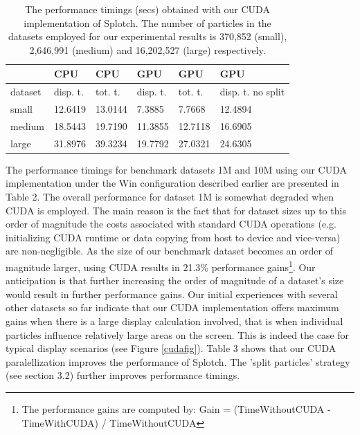 \begin{table}
\caption{The performance timings (secs) obtained with our CUDA implementation of Splotch. 
The number of particles in the datasets employed for our experimental results is 
370,852 (small), 2,646,991 (medium) and 16,202,527 (large) respectively.}

\begin{center}
\begin{tabular}{ | l || l | l || l | l | p{3cm} |}
\hline  
   &	CPU	& CPU	& GPU	& GPU	& GPU \\
\hline
  dataset & disp. t. & tot. t. & disp. t. & tot. t. & disp. t. no split \\
\hline  
  small &	12.6419	& 13.0144	& 7.3885	& 7.7668	& 12.4894 \\
\hline
  medium &	18.5443 &	19.7190 &	11.3855 &	12.7118 &	16.6905 \\
\hline
  large	& 31.8976 &	39.3234 &	19.7792 &	27.0321	& 24.6305\\
\hline
\end{tabular}
\end{center}
\end{table}

The performance timings for benchmark datasets 1M and 10M using our CUDA 
implementation under the Win configuration described earlier are presented in Table 2. 
The overall performance for dataset 1M is somewhat degraded when CUDA is employed. 
The main reason is the fact that for dataset sizes up to this order of magnitude the 
costs associated with standard CUDA operations (e.g. initializing CUDA runtime 
or data copying from host to device and vice-versa) are non-negligible. 
As the size of our benchmark dataset becomes an order of magnitude larger, 
using CUDA results in 21.3\% performance gains\footnote{The performance gains 
are computed by: Gain = (TimeWithoutCUDA - TimeWithCUDA) / TimeWithoutCUDA}. 
Our anticipation is that further increasing the order of magnitude of a dataset's 
size would result in further performance gains. Our initial experiences with several 
other datasets so far indicate that our CUDA implementation offers maximum gains 
when there is a large display calculation involved, that is when individual particles influence relatively large areas on the screen. This is indeed the case for typical display scenarios (see Figure \ref{cudafig}). Table 3 shows that our CUDA paralellization improves the 
performance of Splotch. The 'split particles' strategy (see section 3.2) further 
improves performance timings.
 
